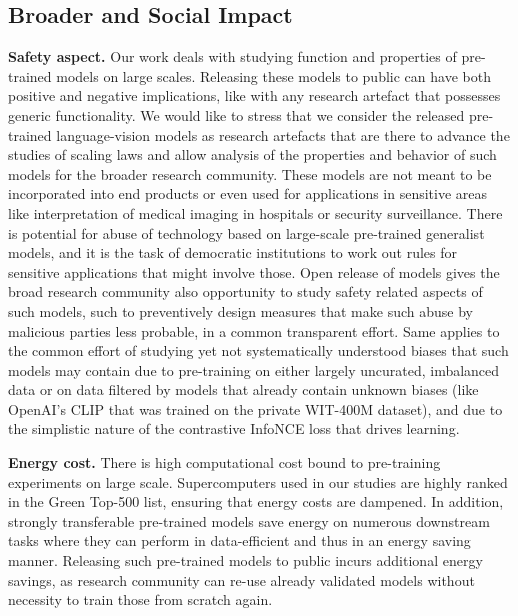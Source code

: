 \begin{appendix}
\section*{Broader and Social Impact}
\label{sec:impact}
% 
\textbf{Safety aspect.} Our work deals with studying function and properties of pre-trained models on large scales. Releasing these models to public can have both positive and negative implications, like with any research artefact that possesses generic functionality. We would like to stress that we consider the released pre-trained language-vision models as research artefacts that are there to advance the studies of scaling laws and allow analysis of the properties and behavior of such models for the broader research community. These models are not meant to be incorporated into end products or even used for applications in sensitive areas like interpretation of medical imaging in hospitals or security surveillance. There is potential for abuse of technology based on large-scale pre-trained generalist models, and it is the task of democratic institutions to work out rules for sensitive applications that might involve those. Open release of models gives the broad research community also opportunity to  study safety related aspects of such models, such to preventively design measures that make such abuse by malicious parties less probable, in a common transparent effort. Same applies to the common effort of studying yet not systematically understood biases that such models may contain due to pre-training on either largely uncurated, imbalanced data or on data filtered by models that already contain unknown biases (like OpenAI's CLIP that was trained on the private WIT-400M dataset), and due to the simplistic nature of the contrastive InfoNCE loss that drives learning.

\textbf{Energy cost.} There is high computational cost bound to pre-training experiments on large scale. Supercomputers used in our studies are highly ranked in the Green Top-500 list, ensuring that energy costs are dampened. In addition, strongly transferable pre-trained models save energy on numerous downstream tasks where they can perform in data-efficient and thus in an energy saving manner. Releasing such pre-trained models to public incurs additional energy savings, as research community can re-use already validated models without necessity to train those from scratch again.     



\end{appendix}
